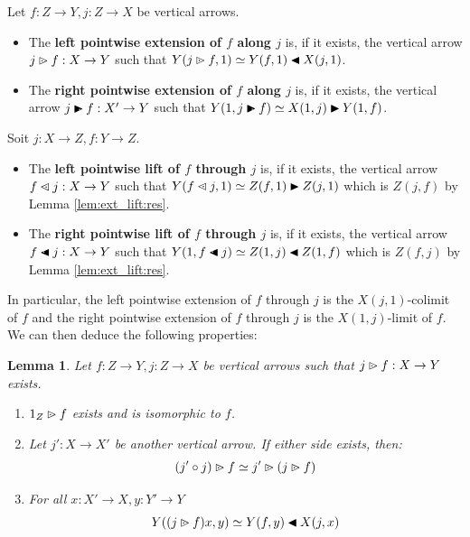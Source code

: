 \documentclass[10pt,a4paper]{article}
\newcommand{\flip}[1]{\text{\rotatebox[origin=c]{-180}{$#1$}}}
\newcommand{\plext}{\mathbin{{\rhd}\mathclap{\mspace{-17.5mu}\cdot}}}
\newcommand{\plift}{\mathbin{\flip{{\rhd}\mathclap{\mspace{-17.5mu}\cdot}}}}
\newcommand{\prext}{\mathbin{{\blacktriangleright}\mathclap{\mspace{-10.5mu}\raisebox{-0.45pt}{\textcolor{white}{$\cdot$}}}}}
\newcommand{\prift}{\mathbin{\flip{{\blacktriangleright}\mathclap{\mspace{-10.5mu}\raisebox{-0.45pt}{\textcolor{white}{$\cdot$}}}}}}
\newcommand{\rext}{\mathbin{\blacktriangleright}}
\newcommand{\rift}{\mathbin{\blacktriangleleft}}
\theoremstyle{plain}
\newtheorem{lemma}[theorem]{Lemma}
\theoremstyle{definition}
\theoremstyle{remark}
\begin{document}
\begin{definition}
    \label{def:pointwise}
    Let $f : Z \to Y, j : Z \to X$ be vertical arrows.
    \begin{itemize}
        \item The \textbf{left pointwise extension of $f$ along $j$} is, if it exists, the vertical arrow $j\plext f : X \to Y$ such that $Y(j \plext f, 1) \simeq Y(f, 1) \rift X(j, 1)$.
        \item The \textbf{right pointwise extension of $f$ along $j$} is, if it exists, the vertical arrow $j \prext f : X' \to Y$ such that $Y(1, j\prext f) \simeq X(1, j) \rext Y(1, f)$.
    \end{itemize}
    Soit $j : X \to Z, f : Y \to Z$.
    \begin{itemize}
        \item The \textbf{left pointwise lift of $f$ through $j$} is, if it exists, the vertical arrow $f \plift j : X \to Y$ such that $Y(f\plift j, 1) \simeq Z(f, 1) \rext Z(j, 1)$ which is $Z(j, f)$ by Lemma \ref{lem:ext_lift:res}.
        \item The \textbf{right pointwise lift of $f$ through $j$} is, if it exists, the vertical arrow $f \prift j : X \to Y$ such that $Y(1, f\prift j) \simeq Z(1, j) \rift Z(1, f)$ which is $Z(f, j)$ by Lemma \ref{lem:ext_lift:res}.
    \end{itemize}
\end{definition}

In particular, the left pointwise extension of $f$ through $j$ is the $X(j, 1)$-colimit of $f$ and the right pointwise extension of $f$ through $j$ is the $X(1, j)$-limit of $f$. We can then deduce the following properties:

\begin{lemma}
    \label{lem:pt_ext_props}
    Let $f : Z \to Y, j : Z \to X$ be vertical arrows such that $j \plext f : X \to Y$ exists.
    \begin{enumerate}[ref=\ref{lem:pt_ext_props} (\alph*)]
        \item $1_Z \plext f$ exists and is isomorphic to $f$.
        \item \label{lem:pt_ext_props:comp} Let $j' : X \to X'$ be another vertical arrow. If either side exists, then:
            $$(j'\circ j)\plext f \simeq j' \plext (j\plext f)$$
        \item For all $x : X' \to X, y : Y' \to Y$
            $$Y((j\plext f)x, y) \simeq Y(f, y) \rift X(j, x)$$
    \end{enumerate}
\end{lemma}
\end{document}
